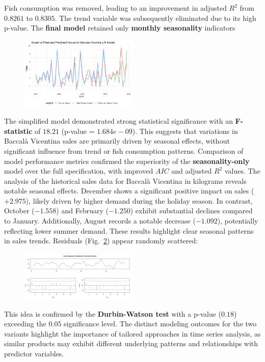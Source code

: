 \documentclass[10pt,twocolumn,letterpaper]{article}
\begin{document}
Fish consumption was removed, leading to an improvement in adjusted $R^2$ from $0.8261$ to $0.8305$.
The trend variable was subsequently eliminated due to its high p-value.
The \textbf{final model} retained only \textbf{monthly seasonality} indicators
\begin{figure}[H]
    \centering
    \includegraphics[width=0.5\textwidth]{PlotsBEFD/PRED_LR_VIC.png} 
    \caption{}
    \label{fig:PRED_LR_VIC}
\end{figure}
The simplified model demonstrated strong statistical significance with an \textbf{F-statistic} of $18.21$ (p-value = $1.684e-09$). This suggests that variations in Baccalà Vicentina sales are primarily driven by seasonal effects, without significant influence from trend or fish consumption patterns.
Comparison of model performance metrics confirmed the superiority of the \textbf{seasonality-only} model over the full specification, with improved $AIC$ and adjusted $R^2$ values. 
\newline
The analysis of the historical sales data for Baccalà Vicentina in kilograms reveals notable seasonal effects. December shows a significant positive impact on sales ($+2.975$), likely driven by higher demand during the holiday season. In contrast, October ($-1.558$) and February ($-1.250$) exhibit substantial declines compared to January. Additionally, August records a notable decrease ($-1.092$), potentially reflecting lower summer demand. These results highlight clear seasonal patterns in sales trends.
\newline
Residuals (Fig.~\ref{fig:RES_LR_VIC}) appear randomly scattered:
\begin{figure}[H]
    \centering
    \includegraphics[width=0.5\textwidth]{PlotsBEFD/RES_LR_VIC.png} 
    \caption{}
    \label{fig:RES_LR_VIC}
\end{figure}
This idea is confirmed by the \textbf{Durbin-Watson test} with a p-value ($0.18$) exceeding the $0.05$ significance level.
The distinct modeling outcomes for the two variants highlight the importance of tailored approaches in time series analysis, as similar products may exhibit different underlying patterns and relationships with predictor variables.
\end{document}
